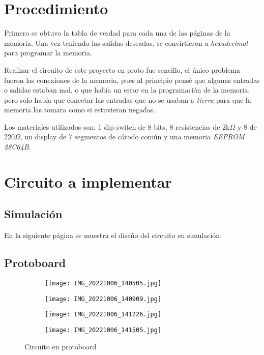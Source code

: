 \documentclass[12pt, oneside, openany]{article}
\begin{document}
\newpage
\section{Procedimiento}
{\sffamily\large
    \hspace{0.5cm} Primero se obtuvo la tabla de verdad para cada una de las páginas de la memoria. Una vez teniendo las salidas deseadas, se convirtieron a \emph{hexadecimal} para programar la memoria.
    
    \hspace{0.5cm} Realizar el circuito de este proyecto en proto fue sencillo, el único problema fueron las conexiones de la memoria, pues al principio pensé que algunas entradas o salidas estaban mal, o que había un error en la programación de la memoria, pero solo había que conectar las entradas que no se usaban a \emph{tierra} para que la memoria las tomara como si estuvieran negadas.
    
    \hspace{0.5cm} Los materiales utilizados son: 1 dip switch de 8 bits, 8 resistencias de 2k$\Omega$ y 8 de 220$\Omega$, un display de 7 segmentos de cátodo común y una memoria \emph{EEPROM 28C64B}.
    
}

\section{Circuito a implementar}
\subsection{Simulación}
{\sffamily\large
    \hspace{0.5cm} En la siguiente página se muestra el diseño del circuito en simulación.
}

\newpage


\newpage
\subsection{Protoboard}
\begin{figure}[h!]
    \centering
    
    \begin{subfigure}[tl]{0.45\textwidth}
        \centering
        \texttt{[image: IMG\_20221006\_140505.jpg]}
    \end{subfigure}
    \begin{subfigure}[tr]{0.45\textwidth}
        \centering
        \texttt{[image: IMG\_20221006\_140909.jpg]}
    \end{subfigure}
    \begin{subfigure}[bl]{0.45\textwidth}
        \centering
        \texttt{[image: IMG\_20221006\_141226.jpg]}
    \end{subfigure}
    \begin{subfigure}[br]{0.45\textwidth}
        \centering
        \texttt{[image: IMG\_20221006\_141505.jpg]}
    \end{subfigure}
    
    \caption{\sffamily Circuito en protoboard}
    \label{fig:proto}
\end{figure}
\end{document}
